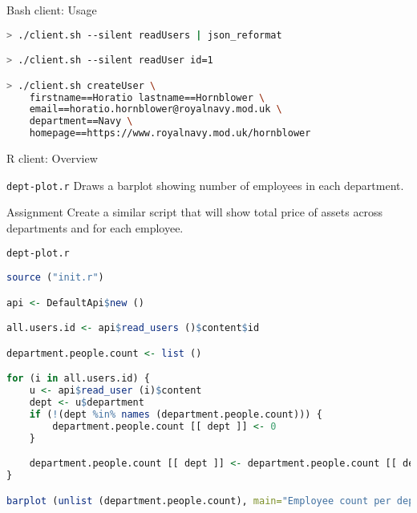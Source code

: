\begin{frame}[fragile]{Bash client: Usage}
\begin{lstlisting}[language=bash]
> ./client.sh --silent readUsers | json_reformat

> ./client.sh --silent readUser id=1

> ./client.sh createUser \
    firstname==Horatio lastname==Hornblower \
    email==horatio.hornblower@royalnavy.mod.uk \
    department==Navy \
    homepage==https://www.royalnavy.mod.uk/hornblower
\end{lstlisting}
\end{frame}


\begin{frame}[fragile]{R client: Overview}
    \begin{block}{\lstinline{dept-plot.r}}
        Draws a barplot showing number of employees in each department.
    \end{block}

    \begin{block}{Assignment}
        Create a similar script that will show total price of
        assets across departments and for each employee.
    \end{block}
\end{frame}


\begin{frame}[fragile]{\lstinline{dept-plot.r}}
\begin{lstlisting}[language=r,style=mini]
source ("init.r")

api <- DefaultApi$new ()

all.users.id <- api$read_users ()$content$id

department.people.count <- list ()

for (i in all.users.id) {
    u <- api$read_user (i)$content
    dept <- u$department
    if (!(dept %in% names (department.people.count))) {
        department.people.count [[ dept ]] <- 0
    }

    department.people.count [[ dept ]] <- department.people.count [[ dept ]] + 1
}

barplot (unlist (department.people.count), main="Employee count per department")
\end{lstlisting}
\end{frame}




